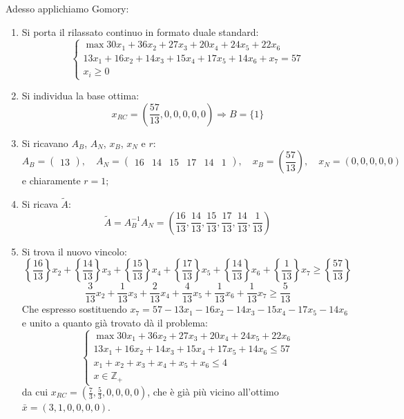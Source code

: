 \documentclass[a4paper,11pt]{article}
\begin{document}
Adesso applichiamo Gomory:
\begin{enumerate}
	\item Si porta il rilassato continuo in formato duale standard:
	\[
		\begin{cases}		
		\max 30 x_1 + 36 x_2 + 27 x_3 + 20 x_4 + 24 x_5 + 22 x_6 \\ 
		13 x_1 + 16 x_2 + 14 x_3 + 15 x_4 +17 x_5 + 14 x_6 + x_7 = 57 \\ 
		x_i \geq 0
		\end{cases}
	\]
\item Si individua la base ottima:
	$$ x_{RC} = \left( \frac{57}{13}, 0, 0, 0, 0, 0 \right) \Rightarrow B= \{1\}$$
\item Si ricavano $A_B$, $A_N$, $x_B$, $x_N$ e $r$:
	$$
	A_B = 
	\begin{pmatrix}
		13
	\end{pmatrix}, \quad 
	A_N = 
	\begin{pmatrix}
		16 & 14 & 15 & 17 & 14 & 1
	\end{pmatrix}, \quad 
	x_B =
	\left(
		\frac{57}{13}
	\right), \quad 
	x_N = 
	\left(
		0 , 0 , 0 , 0 , 0
	\right)
	$$
	e chiaramente $r=1$;
\item Si ricava $\tilde{A}$:
	$$
	\tilde{A} = A_B^{-1} A_N = \left( \frac{16}{13}, \frac{14}{13}, \frac{15}{13}, \frac{17}{13}, \frac{14}{13}, \frac{1}{13} \right)
	$$
\item Si trova il nuovo vincolo:
$$
\left\{ \frac{16}{13} \right\} x_2 + \left\{ \frac{14}{13} \right\} x_3 + \left\{ \frac{15}{13} \right\} x_4 + \left\{ \frac{17}{13} \right\} x_5 + \left\{ \frac{14}{13} \right\} x_6 + \left\{ \frac{1}{13} \right\} x_7 \geq \left\{ \frac{57}{13} \right\}
$$
$$
\frac{3}{13} x_2 + \frac{1}{13} x_3 + \frac{2}{13} x_4 + \frac{4}{13} x_5 + \frac{1}{13} x_6 + \frac{1}{13} x_7 \geq \frac{5}{13}
$$
Che espresso sostituendo $x_7 = 57 - 13 x_1 - 16 x_2 -14 x_3 - 15 x_4 - 17 x_5 - 14 x_6$ e unito a quanto già trovato dà il problema:
$$
	\begin{cases}
		\max 30 x_1 + 36 x_2 + 27 x_3 + 20 x_4 + 24 x_5 + 22 x_6 \\ 
		13 x_1 + 16 x_2 + 14 x_3 + 15 x_4 +17 x_5 + 14 x_6 \leq 57 \\ 
		x_1 + x_2 + x_3 + x_4 + x_5 + x_ 6 \leq 4 \\
		x \in \mathbb{Z}_+
	\end{cases}
$$
da cui $x_{RC} = \left( \frac{7}{3}, \frac{5}{3}, 0, 0, 0, 0 \right)$, che è già più vicino all'ottimo $\bar{x} = \left( 3, 1, 0, 0, 0, 0 \right)$.
\end{enumerate}
\end{document}
